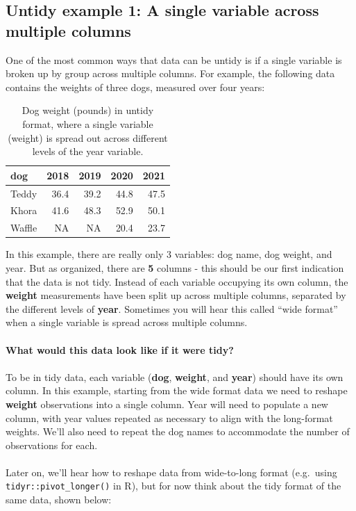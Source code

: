 \documentclass[
]{book}
\begin{document}
\hypertarget{untidy-example-1-a-single-variable-across-multiple-columns}{%
\subsection{Untidy example 1: A single variable across multiple columns}\label{untidy-example-1-a-single-variable-across-multiple-columns}}

One of the most common ways that data can be untidy is if a single variable is broken up by group across multiple columns. For example, the following data contains the weights of three dogs, measured over four years:

\begin{table}

\caption{\label{tab:unnamed-chunk-7}Dog weight (pounds) in untidy format, where a single variable (weight) is spread out across different levels of the year variable.}
\centering
\begin{tabular}[t]{l|r|r|r|r}
\hline
dog & 2018 & 2019 & 2020 & 2021\\
\hline
Teddy & 36.4 & 39.2 & 44.8 & 47.5\\
\hline
Khora & 41.6 & 48.3 & 52.9 & 50.1\\
\hline
Waffle & NA & NA & 20.4 & 23.7\\
\hline
\end{tabular}
\end{table}

In this example, there are really only 3 variables: dog name, dog weight, and year. But as organized, there are \textbf{5} columns - this should be our first indication that the data is not tidy. Instead of each variable occupying its own column, the \textbf{weight} measurements have been split up across multiple columns, separated by the different levels of \textbf{year}. Sometimes you will hear this called ``wide format'' when a single variable is spread across multiple columns.\\
~\\
\textbf{What would this data look like if it were tidy?}\\
~\\
To be in tidy data, each variable (\textbf{dog}, \textbf{weight}, and \textbf{year}) should have its own column. In this example, starting from the wide format data we need to reshape \textbf{weight} observations into a single column. Year will need to populate a new column, with year values repeated as necessary to align with the long-format weights. We'll also need to repeat the dog names to accommodate the number of observations for each.\\
~\\
Later on, we'll hear how to reshape data from wide-to-long format (e.g.~using \texttt{tidyr::pivot\_longer()} in R), but for now think about the tidy format of the same data, shown below:
\end{document}
